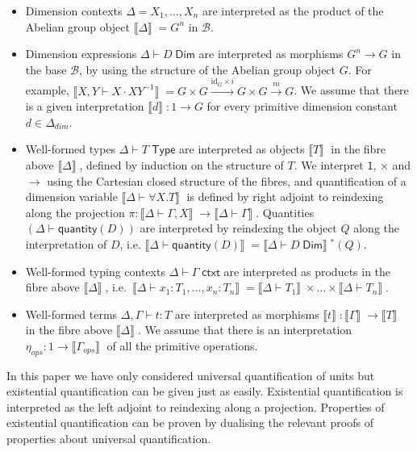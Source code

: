 \documentclass[a4paper,UKenglish]{lipics}
\newcommand{\ra}{\rightarrow}
\newcommand{\msf}[1]{\mathsf{#1}} %
\newcommand{\B}{\mathcal{B}}
\newcommand{\sem}[1]{\ensuremath{\llbracket #1 \rrbracket} \;}
\newcommand{\unitTy}{\msf{1}}
\newcommand{\qnt}{\msf{quantity}}
\newcommand{\Deltadim}{\ensuremath{\Delta_{dim}}}
\newcommand{\Gammaops}{\ensuremath{\Gamma_{ops}}}
\newcommand{\etaops}{\ensuremath{\eta_{ops}}}
\newcommand{\Dj}[2]{#1 \vdash #2 \; \msf{ Dim}}
\newcommand{\id}{\mathrm{id}}
\begin{document}
\begin{itemize}
\item Dimension contexts $\Delta = X_1, \ldots, X_n$ are interpreted as the product of the Abelian group object $\sem{\Delta} = G^n$ in $\B$.
\item Dimension expressions $\Dj \Delta D$ are interpreted as morphisms $G^n \ra G$ in the base $\B$, by using the structure of the Abelian group object $G$. For example, $\sem{X, Y \vdash X \cdot XY^{-1}} = G\times G\xrightarrow{\id_G\times i}G\times G\xrightarrow m G$. We assume that there is a given interpretation $\sem d : 1 \to G$ for every primitive dimension constant $d \in \Deltadim$.

\item Well-formed types $\Delta \vdash T \; \msf{ Type}$ are interpreted as objects $\sem{T}$ in the fibre above $\sem{\Delta}$,  defined by induction on the structure of $T$. We interpret $\unitTy$, $\times$ and $\rightarrow$ using the Cartesian closed structure of the fibres, and quantification of a dimension variable $\sem{\Delta \vdash \forall X. T}$ is defined by right adjoint to reindexing along the projection $\pi: \sem{\Delta \vdash \Gamma, X} \rightarrow \sem{\Delta \vdash \Gamma}$. Quantities $(\Delta \vdash \qnt(D))$ are interpreted by reindexing the object $Q$ along the interpretation of $D$, i.e. $\sem{\Delta \vdash \qnt(D)} = {\sem{\Dj \Delta D}}\!^* (Q)$.

\item Well-formed typing contexts $\Delta \vdash \Gamma \; \msf{ ctxt}$ are interpreted as products in the fibre above $\sem{\Delta}$, i.e.\ $\sem{\Delta \vdash x_1 : T_1 ,\ldots, x_n:T_n} = \sem{\Delta \vdash T_1} \times \ldots \times \sem{\Delta \vdash T_n}$.

\item Well-formed terms $\Delta, \Gamma \vdash t : T$ are interpreted as morphisms $\sem{t} : \sem{\Gamma} \ra \sem{T}$ in the fibre above $\sem{\Delta}$. We assume that there is an interpretation $\etaops : 1 \to \sem{\Gammaops}$ of all the primitive operations.
\end{itemize}

In this paper we have only considered universal quantification of units but existential quantification can be given just as easily. Existential quantification is interpreted as the left adjoint to reindexing along a projection. Properties of  existential quantification can be proven by dualising the relevant proofs of properties about universal quantification.
\end{document}
